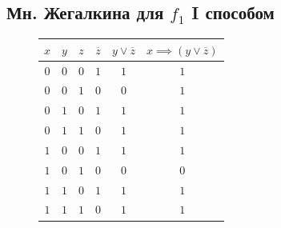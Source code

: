 \documentclass[12pt,a4paper]{article}
\theoremstyle{plain}
\theoremstyle{definition}
\theoremstyle{remark}
\numberwithin{equation}{section}
\begin{document}
\subsection{Мн. Жегалкина для $f_1$ I способом}

\begin{figure}[H]
  \begin{minipage}[t]{0.38\textwidth}
    \vspace{0em}
    \begin{tabularx}{\textwidth}{|c|c|c|c|c|C|}
      \hline
      $x$ & $y$ & $z$ & $\overline{z}$ & $y \lor \overline{z}$ & $x \implies (y \lor \overline{z})$ \\
      \hline
      $0$ & $0$ & $0$ & $1$ & $1$ & $1$ \\
      $0$ & $0$ & $1$ & $0$ & $0$ & $1$ \\  
      $0$ & $1$ & $0$ & $1$ & $1$ & $1$ \\
      $0$ & $1$ & $1$ & $0$ & $1$ & $1$ \\
      $1$ & $0$ & $0$ & $1$ & $1$ & $1$ \\
      $1$ & $0$ & $1$ & $0$ & $0$ & $0$ \\
      $1$ & $1$ & $0$ & $1$ & $1$ & $1$ \\
      $1$ & $1$ & $1$ & $0$ & $1$ & $1$ \\
      \hline  
    \end{tabularx}    
    

\end{minipage}
\end{figure}
\end{document}
